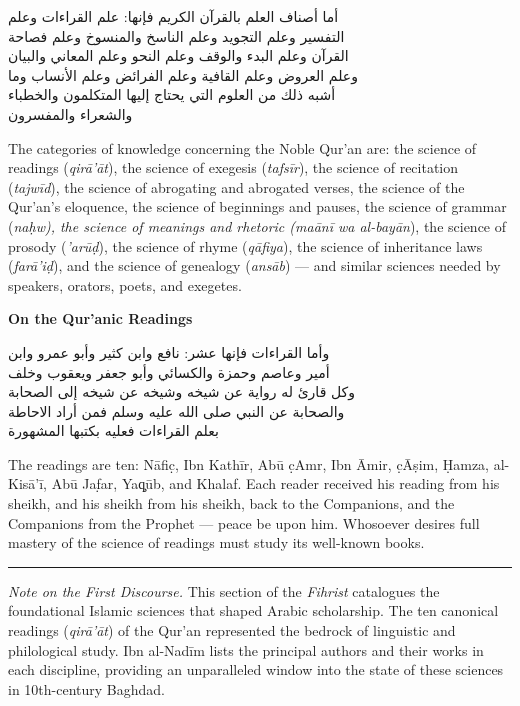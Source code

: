 \documentclass[11pt,a4paper]{article}
\newcommand{\longline}{\noindent\rule{\textwidth}{0.4pt}}
\newcommand{\ar}[1]{{\arabicfont\beginR #1\endR}}
\newcommand{\bilingual}[2]{%
  \noindent
  \begin{minipage}[t]{0.47\textwidth}
    \vspace{0pt}
    \begin{flushright}
    {\arabicfont\beginR #1\endR}
    \end{flushright}
  \end{minipage}%
  \hfill\vline\hfill
  \begin{minipage}[t]{0.47\textwidth}
    \vspace{0pt}
    #2
  \end{minipage}%
  \par\vspace{0.8em}
}
\newcommand{\bilingualsubsection}[2]{%
  \vspace{0.6em}%
  \noindent
  \begin{minipage}[t]{0.47\textwidth}
    \begin{flushright}
    \textbf{\color{sectioncolor}\ar{#1}}
    \end{flushright}
  \end{minipage}%
  \hfill
  \begin{minipage}[t]{0.47\textwidth}
    \textbf{\color{sectioncolor}#2}
  \end{minipage}%
  \par\vspace{0.4em}%
}
\begin{document}
\bilingual
{أما أصناف العلم بالقرآن الكريم فإنها: علم القراءات وعلم\\
التفسير وعلم التجويد وعلم الناسخ والمنسوخ وعلم فصاحة\\
القرآن وعلم البدء والوقف وعلم النحو وعلم المعاني والبيان\\
وعلم العروض وعلم القافية وعلم الفرائض وعلم الأنساب وما\\
أشبه ذلك من العلوم التي يحتاج إليها المتكلمون والخطباء\\
والشعراء والمفسرون}
{The categories of knowledge concerning the Noble Qur'an are: the science
of readings (\textit{qir\=a'\=at}), the science of exegesis
(\textit{tafs\=ir}), the science of recitation (\textit{tajw\=id}), the
science of abrogating and abrogated verses, the science of the Qur'an's
eloquence, the science of beginnings and pauses, the science of grammar
(\textit{na\d{hw}), the science of meanings and rhetoric (\textit{ma}\={a}n\=i
wa al-bay\=an}), the science of prosody (\textit{'ar\=u\d{d}}), the science
of rhyme (\textit{q\=afiya}), the science of inheritance laws
(\textit{far\=a'i\d{d}}), and the science of genealogy (\textit{ans\=ab}) —
and similar sciences needed by speakers, orators, poets, and exegetes.}

\bilingualsubsection{في القراءات}{On the Qur'anic Readings}

\bilingual
{وأما القراءات فإنها عشر: نافع وابن كثير وأبو عمرو وابن\\
أمير وعاصم وحمزة والكسائي وأبو جعفر ويعقوب وخلف\\
وكل قارئ له رواية عن شيخه وشيخه عن شيخه إلى الصحابة\\
والصحابة عن النبي صلى الله عليه وسلم فمن أراد الاحاطة\\
بعلم القراءات فعليه بكتبها المشهورة}
{The readings are ten: N\=afi\d{c}, Ibn Kath\=ir, Ab\=u \d{c}Amr, Ibn
\=Amir, \d{c}\=A\d{s}im, \d{H}amza, al-Kis\=a'\=i, Ab\=u Ja\d{far},
Ya\c{q}\=ub, and Khalaf. Each reader received his reading from his
sheikh, and his sheikh from his sheikh, back to the Companions, and the
Companions from the Prophet — peace be upon him. Whosoever desires full
mastery of the science of readings must study its well-known books.}

\vspace{1em}
\longline
\vspace{0.5em}

\noindent\textit{Note on the First Discourse.} This section of the
\textit{Fihrist} catalogues the foundational Islamic sciences that shaped
Arabic scholarship. The ten canonical readings (\textit{qir\=a'\=at}) of
the Qur'an represented the bedrock of linguistic and philological study.
Ibn al-Nad\=im lists the principal authors and their works in each
discipline, providing an unparalleled window into the state of these
sciences in 10th-century Baghdad.
\end{document}
